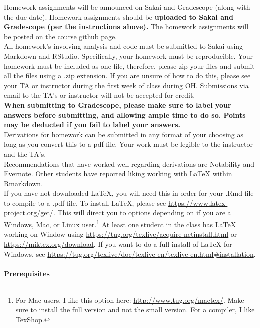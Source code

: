 \documentclass[11pt]{article}
\begin{document}
Homework assignments will be announced on Sakai and Gradescope (along with the due date). Homework assignments should be \textbf{uploaded to Sakai and Gradescope (per the instructions above).} The homework assignments will be posted on the course github page. \\

All homework's involving analysis and code must be submitted to Sakai using Markdown and RStudio. Specifically, your homework must be reproducible. Your homework must be included as one file, therefore, please zip your files and submit all the files using a .zip extension. If you are unsure of how to do this, please see your TA or instructor during the first week of class during OH. Submissions via email to the TA's or instructor will not be accepted for credit. \\

\textbf{When submitting to Gradescope, please make sure to label your answers before submitting, and allowing ample time to do so. Points may be deducted if you fail to label your answers.}\\

Derivations for homework can be submitted in any format of your choosing as long as you convert this to a pdf file. Your work must be legible to the instructor and the TA's. \\

Recommendations that have worked well regarding derivations are Notability and Evernote. Other students have reported liking working with LaTeX within Rmarkdown. \\

If you have not downloaded LaTeX, you will need this in order for your .Rmd file to compile to a .pdf file. To install LaTeX, please see \url{https://www.latex-project.org/get/}. This will direct you to options depending on if you are a Windows, Mac, or Linux user.\footnote{For Mac users, I like this option here: \url{http://www.tug.org/mactex/}. Make sure to install the full version and not the small version. For a compiler, I like TexShop.}  At least one student in the class has LaTeX working on Window using \url{https://tug.org/texlive/acquire-netinstall.html} or \url{https://miktex.org/download}. If you want to do a full install of LaTeX for Windows, see \url{https://tug.org/texlive/doc/texlive-en/texlive-en.html#installation}.


\paragraph{Prerequisites}
\end{document}

